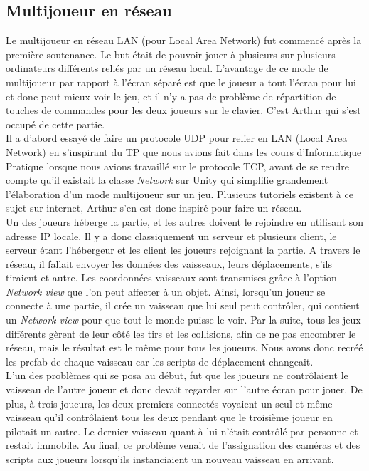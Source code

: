 \documentclass[12pt, titlepage]{article}
\begin{document}
\begin{spacing}{1.5}
\newpage

\subsection{Multijoueur en réseau}

Le multijoueur en réseau LAN (pour Local Area Network) fut commencé après la première soutenance. Le but était de pouvoir jouer à plusieurs sur plusieurs ordinateurs différents reliés par un réseau local. L'avantage de ce mode de multijoueur par rapport à l'écran séparé est que le joueur a tout l'écran pour lui et donc peut mieux voir le jeu, et il n'y a pas de problème de répartition de touches de commandes pour les deux joueurs sur le clavier. C'est Arthur qui s'est occupé de cette partie.\\

Il a d'abord essayé de faire un protocole UDP pour relier en LAN (Local Area Network) en s'inspirant du TP que nous avions fait dans les cours d'Informatique Pratique lorsque nous avions travaillé sur le protocole TCP, avant de se rendre compte qu'il existait la classe \textit{Network} sur Unity qui simplifie grandement l'élaboration d'un mode multijoueur sur un jeu. Plusieurs tutoriels existent à ce sujet sur internet, Arthur s'en est donc inspiré pour faire un réseau.\\

Un des joueurs héberge la partie, et les autres doivent le rejoindre en utilisant son adresse IP locale. Il y a donc classiquement un serveur et plusieurs client, le serveur étant l'hébergeur et les client les joueurs rejoignant la partie. A travers le réseau, il fallait envoyer les données des vaisseaux, leurs déplacements, s'ils tiraient et autre. Les coordonnées vaisseaux sont transmises grâce à l'option \textit{Network view} que l'on peut affecter à un objet. Ainsi, lorsqu'un joueur se connecte à une partie, il crée un vaisseau que lui seul peut contrôler, qui contient un \textit{Network view} pour que tout le monde puisse le voir. Par la suite, tous les jeux différents gèrent de leur côté les tirs et les collisions, afin de ne pas encombrer le réseau, mais le résultat est le même pour tous les joueurs. Nous avons donc recréé les prefab de chaque vaisseau car les scripts de déplacement changeait.\\

L'un des problèmes qui se posa au début, fut que les joueurs ne contrôlaient le vaisseau de l'autre joueur et donc devait regarder sur l'autre écran pour jouer. De plus, à trois joueurs, les deux
premiers connectés voyaient un seul et même vaisseau qu'il contrôlaient tous les deux pendant que le troisième joueur en pilotait un autre. Le dernier vaisseau quant à lui n'était contrôlé par personne et restait immobile. Au final, ce problème venait de l'assignation des caméras et des scripts aux joueurs lorsqu'ils instanciaient un nouveau vaisseau en arrivant.\\


\end{spacing}
\end{document}
